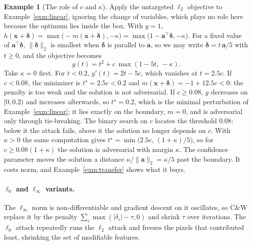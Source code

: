 \documentclass[10pt,a4paper]{extarticle}
\theoremstyle{definition}
\newtheorem{example}{Example}[section]
\newcommand{\x}{\mathbf{x}}
\newcommand{\bdelta}{\boldsymbol{\delta}}
\begin{document}
\begin{example}[The role of \(c\) and \(\kappa\)]\label{exm:cw}
Apply the untargeted \(\ell_2\) objective to Example~\ref{exm:linear}, ignoring the change of variables, which plays no role here because the optimum lies inside the box. With \(y=1\), \(h(\x+\bdelta)=\max\big(-m(\x+\bdelta),-\kappa\big)=\max\big(1-\mathbf{a}^\top\bdelta,-\kappa\big)\). For a fixed value of \(\mathbf{a}^\top\bdelta\), \(\|\bdelta\|_2\) is smallest when \(\bdelta\) is parallel to \(\mathbf{a}\), so we may write \(\bdelta=t\,\mathbf{a}/5\) with \(t\ge0\), and the objective becomes
\[
g(t)=t^2+c\,\max(1-5t,\,-\kappa).
\]
Take \(\kappa=0\) first. For \(t<0.2\), \(g'(t)=2t-5c\), which vanishes at \(t=2.5c\). If \(c<0.08\), the minimizer is \(t^\star=2.5c<0.2\) and \(m(\x+\bdelta)=-1+12.5c<0\): the penalty is too weak and the solution is not adversarial. If \(c\ge0.08\), \(g\) decreases on \([0,0.2)\) and increases afterwards, so \(t^\star=0.2\), which is the minimal perturbation of Example~\ref{exm:linear}; it lies exactly on the boundary, \(m=0\), and is adversarial only through tie-breaking. The binary search on \(c\) locates the threshold \(0.08\): below it the attack fails, above it the solution no longer depends on \(c\). With \(\kappa>0\) the same computation gives \(t^\star=\min\big(2.5c,\,(1+\kappa)/5\big)\), so for \(c\ge0.08(1+\kappa)\) the solution is adversarial with margin \(\kappa\). The confidence parameter moves the solution a distance \(\kappa/\|\mathbf{a}\|_2=\kappa/5\) past the boundary. It costs norm, and Example~\ref{exm:transfer} shows what it buys.
\end{example}

\paragraph{\(\ell_0\) and \(\ell_\infty\) variants.} The \(\ell_\infty\) norm is non-differentiable and gradient descent on it oscillates, so C\&W replace it by the penalty \(\sum_i \max(|\delta_i|-\tau,0)\) and shrink \(\tau\) over iterations. The \(\ell_0\) attack repeatedly runs the \(\ell_2\) attack and freezes the pixels that contributed least, shrinking the set of modifiable features.
\end{document}
